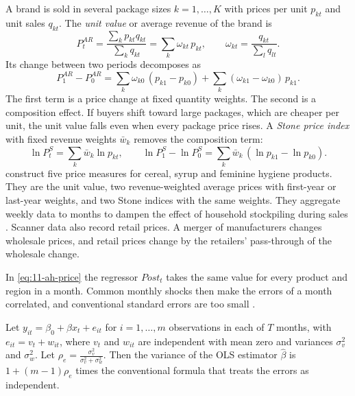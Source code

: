  A brand is sold in several package sizes $k=1,\dots,K$ with prices per
unit $p_{kt}$ and unit sales $q_{kt}$. The \emph{unit value} or average revenue of the brand is
\begin{equation*}
P^{AR}_t=\frac{\sum_k p_{kt}q_{kt}}{\sum_k q_{kt}}=\sum_k\omega_{kt}\,p_{kt},\qquad \omega_{kt}=\frac{q_{kt}}{\sum_l q_{lt}}.
\end{equation*}
Its change between two periods decomposes as
\begin{equation*}
P^{AR}_1-P^{AR}_0=\sum_k\omega_{k0}\,(p_{k1}-p_{k0})+\sum_k(\omega_{k1}-\omega_{k0})\,p_{k1}.
\end{equation*}
The first term is a price change at fixed quantity weights. The second is a composition effect. If buyers shift
toward large packages, which are cheaper per unit, the unit value falls even when every package price rises. A
\emph{Stone price index} with fixed revenue weights $\bar w_k$ removes the composition term:
\begin{equation*}
\ln P^{S}_t=\sum_k\bar w_k\ln p_{kt},\qquad \ln P^{S}_1-\ln P^{S}_0=\sum_k\bar w_k\,(\ln p_{k1}-\ln p_{k0}).
\end{equation*}
\citet{AshenfelterHosken2010} construct five price measures for cereal, syrup and feminine hygiene products. They
are the unit value, two revenue-weighted average prices with first-year or last-year weights, and two Stone indices
with the same weights. They aggregate weekly data to months to dampen the effect of household stockpiling during sales
\citep{HendelNevo2006}. Scanner data also record retail prices. A merger of manufacturers changes wholesale
prices, and retail prices change by the retailers' pass-through of the wholesale change.

 In \eqref{eq:11-ah-price} the regressor $\mathit{Post}_t$ takes the same value for
every product and region in a month. Common monthly shocks then make the errors of a month correlated, and
conventional standard errors are too small \citep{Moulton1987}.

\begin{lemma}\label{lem:11-moulton}
Let $y_{it}=\beta_0+\beta x_t+e_{it}$ for $i=1,\dots,m$ observations in each of $T$ months, with
$e_{it}=v_t+w_{it}$, where $v_t$ and $w_{it}$ are independent with mean zero and variances $\sigma_v^2$ and
$\sigma_w^2$. Let $\rho_e=\frac{\sigma_v^2}{\sigma_v^2+\sigma_w^2}$. Then the variance of the OLS estimator
$\hat\beta$ is $1+(m-1)\rho_e$ times the conventional formula that treats the errors as independent.
\end{lemma}

